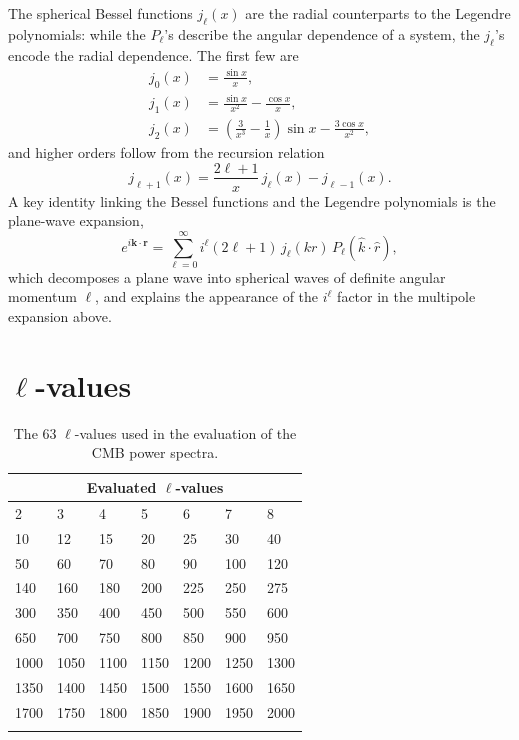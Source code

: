 \documentclass[twocolumn]{aa}
\begin{document}
\begin{appendix}
The spherical Bessel functions $j_\ell(x)$ are the radial counterparts to the Legendre polynomials: while the $P_\ell$'s describe the angular dependence of a system, the $j_\ell$'s encode the radial dependence. The first few are
\begin{align*}
      j_0(x) &= \frac{\sin x}{x},\\
      j_1(x) &= \frac{\sin x}{x^2} - \frac{\cos x}{x},\\
      j_2(x) &= \left(\frac{3}{x^3} - \frac{1}{x}\right)\sin x - \frac{3\cos x}{x^2},
\end{align*}
and higher orders follow from the recursion relation
\begin{equation*}
      j_{\ell+1}(x) = \frac{2\ell+1}{x}\,j_\ell(x) - j_{\ell-1}(x).
\end{equation*}
A key identity linking the Bessel functions and the Legendre polynomials is the plane-wave expansion,
\begin{equation*}
      e^{i\mathbf{k}\cdot\mathbf{r}} = \sum_{\ell=0}^{\infty} i^\ell (2\ell+1)\,j_\ell(kr)\,P_\ell(\hat{k}\cdot\hat{r}),
\end{equation*}
which decomposes a plane wave into spherical waves of definite angular momentum $\ell$, and explains the appearance of the $i^\ell$ factor in the multipole expansion above.
\section{$\ell$-values}
\begin{table}[h!]
\centering
\renewcommand{\arraystretch}{1.3}
\begin{tabular}{*{7}{l}}
\hline\hline
\multicolumn{7}{c}{Evaluated $\ell$-values}\\
\hline
2 & 3 & 4 & 5 & 6 & 7 & 8 \\
10 & 12 & 15 & 20 & 25 & 30 & 40 \\
50 & 60 & 70 & 80 & 90 & 100 & 120 \\
140 & 160 & 180 & 200 & 225 & 250 & 275 \\
300 & 350 & 400 & 450 & 500 & 550 & 600 \\
650 & 700 & 750 & 800 & 850 & 900 & 950 \\
1000 & 1050 & 1100 & 1150 & 1200 & 1250 & 1300 \\
1350 & 1400 & 1450 & 1500 & 1550 & 1600 & 1650 \\
1700 & 1750 & 1800 & 1850 & 1900 & 1950 & 2000 \\
\hline\hline\\
\end{tabular}
\caption{The 63 $\ell$-values used in the evaluation of the CMB power spectra.}
\label{tab:ell_values}
\end{table}
\end{appendix}
\end{document}
